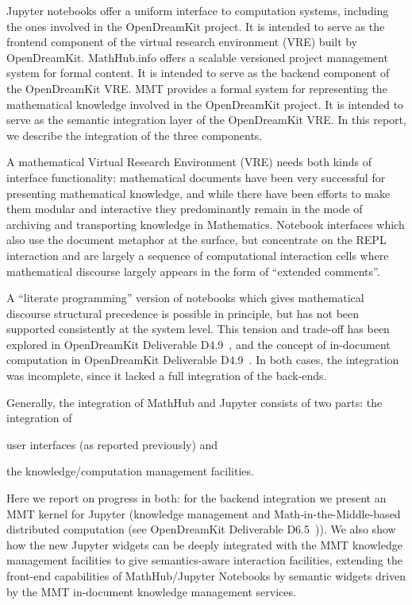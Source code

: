 Jupyter notebooks offer a uniform interface to computation systems, including the ones involved in the OpenDreamKit project.
It is intended to serve as the frontend component of the virtual research environment (VRE) built by OpenDreamKit.
MathHub.info offers a scalable versioned project management system for formal content.
It is intended to serve as the backend component of the OpenDreamKit VRE.
MMT provides a formal system for representing the mathematical knowledge involved in the OpenDreamKit project.
It is intended to serve as the semantic integration layer of the OpenDreamKit VRE.
In this report, we describe the integration of the three components.

A mathematical Virtual Research Environment (VRE) needs both kinds of interface functionality: mathematical documents have been very successful for presenting mathematical knowledge, and while there have been efforts to make them modular and interactive they predominantly remain in the mode of archiving and transporting knowledge in Mathematics.
Notebook interfaces which also use the document metaphor at the surface, but concentrate on the REPL interaction and are largely a sequence of computational interaction cells where mathematical discourse largely appears in the form of ``extended comments''.

A ``literate programming'' version of notebooks which gives mathematical discourse structural precedence is possible in principle, but has not been supported consistently at the system level.
This tension and trade-off has been explored in OpenDreamKit Deliverable D4.9~\cite{ODK-D4.2}, and the concept of in-document computation in OpenDreamKit Deliverable D4.9~\cite{ODK-D4.9}.
In both cases, the integration was incomplete, since it lacked a full integration of the back-ends. 

Generally, the integration of MathHub and Jupyter consists of two parts: the integration of
\begin{inparaenum}[\em a\rm )]
\item user interfaces (as reported previously) and
\item the knowledge/computation management facilities. 
\end{inparaenum}
Here we report on progress in both: for the backend integration we present an MMT kernel for Jupyter (knowledge management and Math-in-the-Middle-based distributed computation (see OpenDreamKit Deliverable D6.5~\cite{ODK-D6.5})).
We also show how the new Jupyter widgets can be deeply integrated with the MMT knowledge management facilities to give semantics-aware interaction facilities, extending the front-end capabilities of MathHub/Jupyter Notebooks by semantic widgets driven by the MMT in-document knowledge management services.
 
